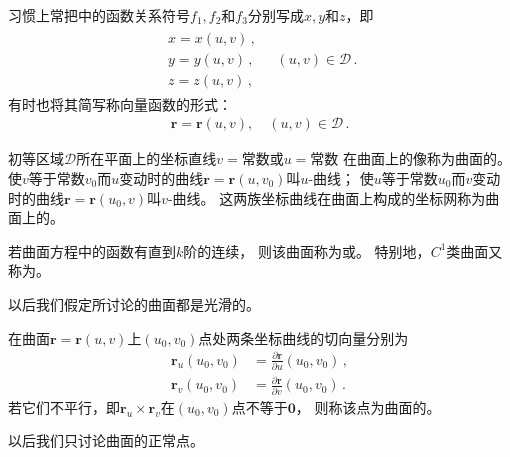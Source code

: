 习惯上常把中的函数关系符号$f_1,f_2$和$f_3$分别写成$x,y$和$z$，即
\begin{align}\label{eq:03ex01.10}
    \begin{array}{l}
        x=x(u,v)\, , \\
        y=y(u,v)\, , \\
        z=z(u,v)\, ,
    \end{array}\quad (u,v)\in \mathscr{D}\, .
\end{align}
有时也将其简写称向量函数的形式：
\begin{align}\label{eq:03ex01.11}
    \bm r=\bm r(u,v),\quad (u,v)\in \mathscr{D}\, .
\end{align}

\begin{definition}
    初等区域$\mathscr{D}$所在平面上的坐标直线$v=$常数或$u=$常数
    在曲面上的像称为曲面的。
    使$v$等于常数$v_0$而$u$变动时的曲线$\bm r=\bm r(u,v_0)$叫$u$-曲线；
    使$u$等于常数$u_0$而$v$变动时的曲线$\bm r=\bm r(u_0,v)$叫$v$-曲线。
    这两族坐标曲线在曲面上构成的坐标网称为曲面上的。
\end{definition}

\begin{definition}
    若曲面方程中的函数有直到$k$阶的连续，
    则该曲面称为或。
    特别地，$C^1$类曲面又称为。
\end{definition}

以后我们假定所讨论的曲面都是光滑的。

\begin{definition}
    在曲面$\bm r=\bm r(u,v)$上$(u_0,v_0)$点处两条坐标曲线的切向量分别为
    \begin{align}\label{eq:03ex01.12}
        \bm r_u(u_0,v_0) & =\frac{\partial \bm r}{\partial u}(u_0,v_0)\, , \\
        \bm r_v(u_0,v_0) & =\frac{\partial \bm r}{\partial v}(u_0,v_0)\, .
    \end{align}
    若它们不平行，即$\bm r_u\times\bm r_v$在$(u_0,v_0)$点不等于$\bm 0$，
    则称该点为曲面的。
\end{definition}

以后我们只讨论曲面的正常点。

